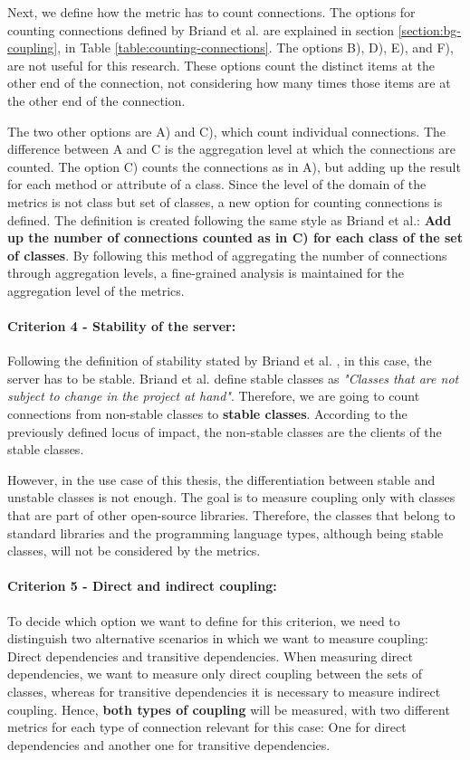 Next, we define how the metric has to count connections. The options for counting connections defined by Briand et al. are explained in section \ref{section:bg-coupling}, in Table \ref{table:counting-connections}. The options B), D), E), and F), are not useful for this research. These options count the distinct items at the other end of the connection, not considering how many times those items are at the other end of the connection.

The two other options are A) and C), which count individual connections. The difference between A and C is the aggregation level at which the connections are counted. The option C) counts the connections as in A), but adding up the result for each method or attribute of a class. Since the level of the domain of the metrics is not class but set of classes, a new option for counting connections is defined. The definition is created following the same style as Briand et al.: \textbf{Add up the number of connections counted as in C) for each class of the set of classes}. By following this method of aggregating the number of connections through aggregation levels, a fine-grained analysis is maintained for the aggregation level of the metrics.

\paragraph{Criterion 4 - Stability of the server:}
Following the definition of stability stated by Briand et al. \cite{briand1999unified}, in this case, the server has to be stable. Briand et al. define stable classes as \textit{"Classes that are not subject to change in the project at hand"}. Therefore, we are going to count connections from non-stable classes to \textbf{stable classes}. According to the previously defined locus of impact, the non-stable classes are the clients of the stable classes.

However, in the use case of this thesis, the differentiation between stable and unstable classes is not enough. The goal is to measure coupling only with classes that are part of other open-source libraries. Therefore, the classes that belong to standard libraries and the programming language types, although being stable classes, will not be considered by the metrics.

\paragraph{Criterion 5 - Direct and indirect coupling:}
To decide which option we want to define for this criterion, we need to distinguish two alternative scenarios in which we want to measure coupling: Direct dependencies and transitive dependencies. When measuring direct dependencies, we want to measure only direct coupling between the sets of classes, whereas for transitive dependencies it is necessary to measure indirect coupling. Hence, \textbf{both types of coupling} will be measured, with two different metrics for each type of connection relevant for this case: One for direct dependencies and another one for transitive dependencies.

